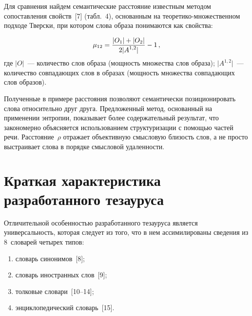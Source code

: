 \begin{multicols}{2}
        
     Для сравнения найдем семантические расстояние   известным методом 
сопоставления свойств~[7] (табл.~4), основанным на тео\-ре\-ти\-ко-мно\-же\-ст\-вен\-ном 
подходе Тверски, при котором слова 
образа понимаются как свойства:

\noindent
     \begin{equation*}
     \mu_{12} = \displaystyle\frac{\displaystyle \vert O_1\vert +\vert O_2\vert\mathstrut}{\displaystyle 2\vert A^{1,2}\vert\mathstrut}-1\,,
     \end{equation*}
где $\vert O\vert$~--- количество слов образа (мощность множества слов 
образа);
$\vert A^{1,2}\vert$~--- количество совпадающих слов в образах (мощность 
множества совпадающих слов образов).


     
     
     
     Полученные в примере расстояния позволяют семантически 
позиционировать слова относительно друг друга. Предложенный метод, 
основанный на применении энтропии, показывает более содержательный 
результат, что закономерно объясняется использованием структуризации с 
помощью частей речи. Расстояние~$\rho$ отражает объективную смысловую 
близость слов, а не просто выстраивает слова в порядке смысловой 
удаленности.

\vspace*{-6pt}
     
\section{Краткая характеристика разработанного тезауруса}

     Отличительной особенностью разработанного тезауруса является 
универсальность, которая следует из того, что в нем ассимилированы сведения 
из 8~словарей четырех типов: 
     \begin{enumerate}[(1)]
\item словарь синонимов~[8];
\item словарь иностранных слов~[9];
\item толковые словари~[10--14];
\item энциклопедический словарь~[15].
\end{enumerate}

\end{multicols}

